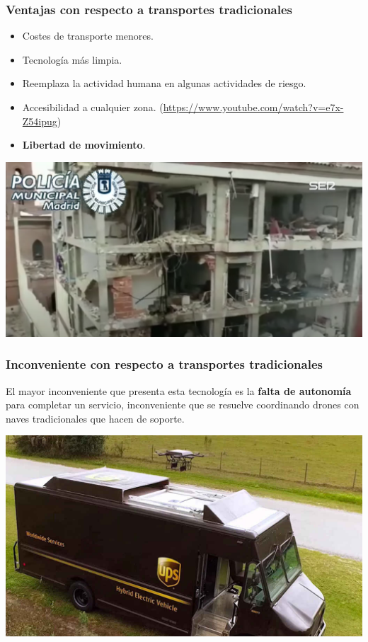 \documentclass[slidestop,usepdftitle=false, xcolor=table]{beamer}
\begin{document}
	\begin{frame}
		\frametitle{Ventajas con respecto a transportes tradicionales}
		\begin{itemize}
			\item Costes de transporte menores.
			\pause
			\item Tecnología más limpia.
			\pause
			\item Reemplaza la actividad humana en algunas actividades de riesgo.
			\pause
			\item Accesibilidad a cualquier zona. (\url{https://www.youtube.com/watch?v=e7x-Z54ipug})
			\item \textbf{Libertad de movimiento}.
		\end{itemize}
		\begin{center}
			\includegraphics[width=0.55\linewidth]{dron_inspeccion}
		\end{center}
	\end{frame}

	\begin{frame}
		\frametitle{Inconveniente con respecto a transportes tradicionales}
		El mayor inconveniente que presenta esta tecnología es la \textbf{falta de autonomía} para completar un servicio, inconveniente que se resuelve coordinando drones con naves tradicionales que hacen de soporte.
		\begin{center}
			\includegraphics[width=0.8\linewidth]{dron_camion}
		\end{center}
	\end{frame}
\end{document}
